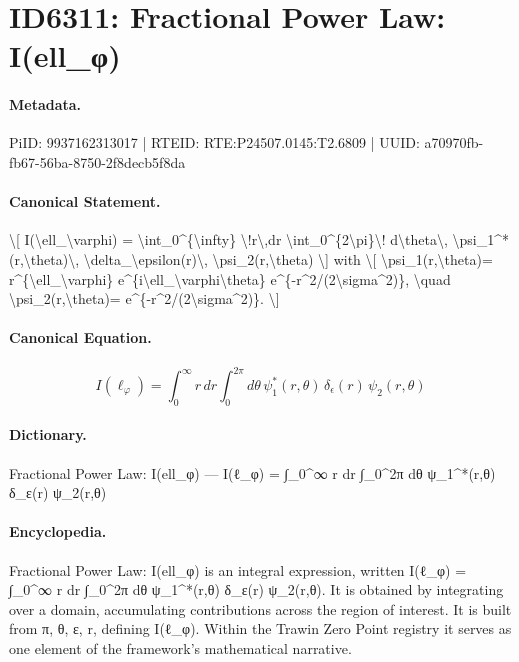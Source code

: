 \section*{ID6311: Fractional Power Law: I(ell\_φ)}
\paragraph{Metadata.}
PiID: 9937162313017 | RTEID: RTE:P24507.0145:T2.6809 | UUID: a70970fb-fb67-56ba-8750-2f8decb5f8da

\paragraph{Canonical Statement.}
\textbackslash{}[ I(\textbackslash{}ell\_\textbackslash{}varphi) = \textbackslash{}int\_0\textasciicircum{}\{\textbackslash{}infty\} \textbackslash{}!r\textbackslash{},dr \textbackslash{}int\_0\textasciicircum{}\{2\textbackslash{}pi\}\textbackslash{}! d\textbackslash{}theta\textbackslash{}, \textbackslash{}psi\_1\textasciicircum{}*(r,\textbackslash{}theta)\textbackslash{}, \textbackslash{}delta\_\textbackslash{}epsilon(r)\textbackslash{}, \textbackslash{}psi\_2(r,\textbackslash{}theta) \textbackslash{}] with \textbackslash{}[ \textbackslash{}psi\_1(r,\textbackslash{}theta)= r\textasciicircum{}\{\textbackslash{}ell\_\textbackslash{}varphi\} e\textasciicircum{}\{i\textbackslash{}ell\_\textbackslash{}varphi\textbackslash{}theta\} e\textasciicircum{}\{-r\textasciicircum{}2/(2\textbackslash{}sigma\textasciicircum{}2)\}, \textbackslash{}quad \textbackslash{}psi\_2(r,\textbackslash{}theta)= e\textasciicircum{}\{-r\textasciicircum{}2/(2\textbackslash{}sigma\textasciicircum{}2)\}. \textbackslash{}]

\paragraph{Canonical Equation.}
\[
I(\ell_\varphi) = \int_0^{\infty} \!r\,dr \int_0^{2\pi}\! d\theta\, \psi_1^*(r,\theta)\, \delta_\epsilon(r)\, \psi_2(r,\theta)
\]

\paragraph{Dictionary.}
Fractional Power Law: I(ell\_φ) — I(ℓ\_φ) = ∫\_0\textasciicircum{}∞ r dr ∫\_0\textasciicircum{}2π dθ ψ\_1\textasciicircum{}*(r,θ) δ\_ε(r) ψ\_2(r,θ)

\paragraph{Encyclopedia.}
Fractional Power Law: I(ell\_φ) is an integral expression, written I(ℓ\_φ) = ∫\_0\textasciicircum{}∞ r dr ∫\_0\textasciicircum{}2π dθ ψ\_1\textasciicircum{}*(r,θ) δ\_ε(r) ψ\_2(r,θ). It is obtained by integrating over a domain, accumulating contributions across the region of interest. It is built from π, θ, ε, r, defining I(ℓ\_φ). Within the Trawin Zero Point registry it serves as one element of the framework's mathematical narrative.
